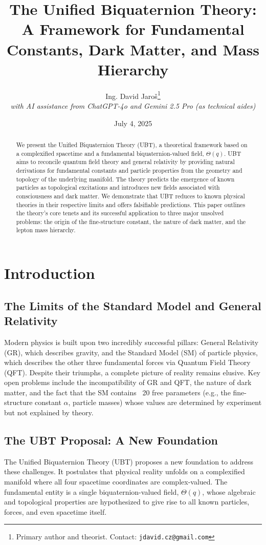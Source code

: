 \documentclass[12pt, a4paper]{article}
\title{\textbf{The Unified Biquaternion Theory: A Framework for Fundamental Constants, Dark Matter, and Mass Hierarchy}}
\author{
  Ing. David Jaroš\thanks{Primary author and theorist. Contact: \texttt{jdavid.cz@gmail.com}} \\
  \textit{with AI assistance from ChatGPT-4o and Gemini 2.5 Pro (as technical aides)}
}
\date{July 4, 2025}
\begin{document}
\maketitle


\begin{abstract}
We present the Unified Biquaternion Theory (UBT), a theoretical framework based on a complexified spacetime and a fundamental biquaternion-valued field, \( \Theta(q) \). UBT aims to reconcile quantum field theory and general relativity by providing natural derivations for fundamental constants and particle properties from the geometry and topology of the underlying manifold. The theory predicts the emergence of known particles as topological excitations and introduces new fields associated with consciousness and dark matter. We demonstrate that UBT reduces to known physical theories in their respective limits and offers falsifiable predictions. This paper outlines the theory's core tenets and its successful application to three major unsolved problems: the origin of the fine-structure constant, the nature of dark matter, and the lepton mass hierarchy.
\end{abstract}

\tableofcontents
\newpage

\section{Introduction}

\subsection{The Limits of the Standard Model and General Relativity}
Modern physics is built upon two incredibly successful pillars: General Relativity (GR), which describes gravity, and the Standard Model (SM) of particle physics, which describes the other three fundamental forces via Quantum Field Theory (QFT). Despite their triumphs, a complete picture of reality remains elusive. Key open problems include the incompatibility of GR and QFT, the nature of dark matter, and the fact that the SM contains ~20 free parameters (e.g., the fine-structure constant \(\alpha\), particle masses) whose values are determined by experiment but not explained by theory.

\subsection{The UBT Proposal: A New Foundation}
The Unified Biquaternion Theory (UBT) proposes a new foundation to address these challenges. It postulates that physical reality unfolds on a complexified manifold where all four spacetime coordinates are complex-valued. The fundamental entity is a single biquaternion-valued field, \( \Theta(q) \), whose algebraic and topological properties are hypothesized to give rise to all known particles, forces, and even spacetime itself.
\end{document}
